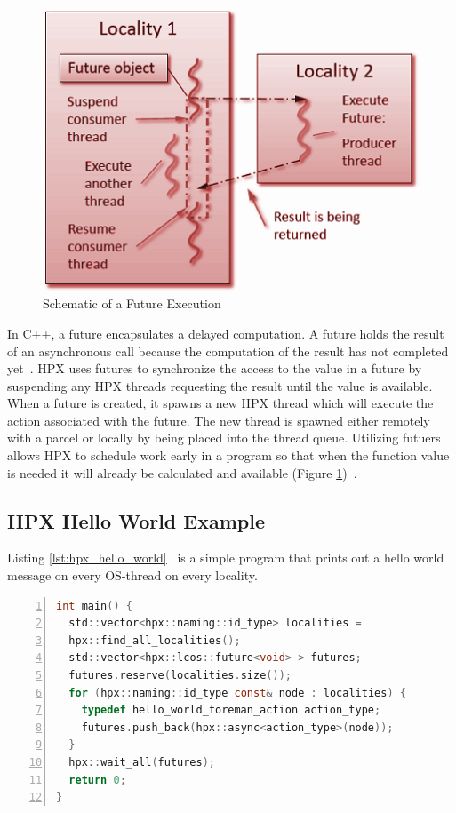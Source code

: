 \begin{figure}[ht]
\centering
\includegraphics[scale=0.8]{images/future_schematics.png}
\caption[Schematic of a Future Execution]{Schematic of a Future Execution}
\label{fig:future_schematics}
\end{figure}

In C++, a future encapsulates a delayed computation. A future holds the result of an asynchronous call because the computation of the result has not completed yet~\cite{stroustrup2013c++}. HPX uses futures to synchronize the access to the value in a future by suspending any HPX threads requesting the result until the value is available. When a future is created, it spawns a new HPX thread which will execute the action associated with the future. The new thread is spawned either remotely with a parcel or locally by being placed into the thread queue.  Utilizing futuers allows HPX to schedule work early in a program so that when the function value is needed it will already be calculated and available (Figure \ref{fig:future_schematics})~\cite{kaiser2009parallex}.

\iffalse
\subsection{HPX Hello World Example}
Listing \ref{lst:hpx_hello_world}~\cite{hpx_hello} is a simple program that prints out a hello world message on every OS-thread on every locality.

\begin{lstlisting}[language=C, frame=single, numbers=left, basicstyle=\footnotesize, caption=HPX Hello World\label{lst:hpx_hello_world}]
int main() {
  std::vector<hpx::naming::id_type> localities =
  hpx::find_all_localities();
  std::vector<hpx::lcos::future<void> > futures;
  futures.reserve(localities.size());
  for (hpx::naming::id_type const& node : localities) {
    typedef hello_world_foreman_action action_type;
    futures.push_back(hpx::async<action_type>(node));
  }
  hpx::wait_all(futures);
  return 0;
}
\end{lstlisting}

